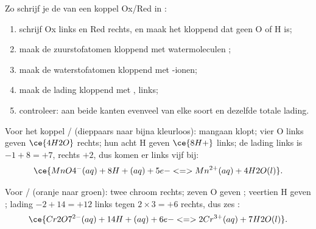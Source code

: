 \begin{method}\label{met:g11:redox:balance}
Zo schrijf je de  van een koppel Ox/Red in :
\begin{enumerate}
  \item schrijf Ox links en Red rechts, en maak het  kloppend dat
        geen O of H is;
  \item maak de zuurstofatomen kloppend met watermoleculen ;
  \item maak de waterstofatomen kloppend met -ionen;
  \item maak de lading kloppend met  , links;
  \item controleer: aan beide kanten evenveel  van elke soort en
        dezelfde totale lading.
\end{enumerate}
\end{method}

\begin{example}\label{ex:g11:redox:permanganate}
Voor het koppel / (dieppaars naar bijna
kleurloos): mangaan klopt; vier O links geven $\ce{4H2O}$ rechts; hun
acht H geven $\ce{8H+}$ links; de lading links is $-1 + 8 = +7$, rechts
$+2$, dus komen er links vijf  bij:
\[
  \ce{MnO4^-(aq) + 8H+(aq) + 5e- <=> Mn^{2+}(aq) + 4H2O(l)}.
\]
\end{example}

\begin{example}\label{ex:g11:redox:dichromate}
Voor / (oranje naar groen): twee chroom
rechts; zeven O geven ; veertien H geven ; lading
$-2 + 14 = +12$ links tegen $2 \times 3 = +6$ rechts, dus zes
:
\[
  \ce{Cr2O7^{2-}(aq) + 14H+(aq) + 6e- <=> 2Cr^{3+}(aq) + 7H2O(l)}.
\]
\end{example}

